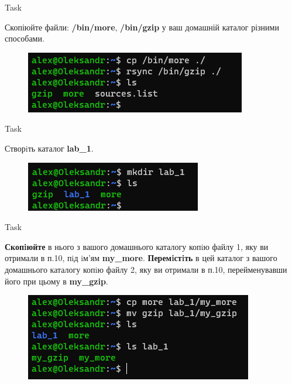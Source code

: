 \documentclass[a4paper,12pt]{article}
\newcommand{\RomanNumeralCaps}[1]{\MakeUppercase{\romannumeral #1}}
\begin{document}
    \begin{center}
        \Large{Task \RomanNumeralCaps{10}}
    \end{center}
    Скопіюйте файли: \textbf{/bin/more}, \textbf{/bin/gzip} у ваш домашній каталог різними способами.
    \begin{figure}[h!]
        \begin{minipage}[h]{1\linewidth}
            \centering
            \includegraphics[width=0.6\linewidth]{Prt sc/Figure_10.png}  
        \end{minipage}
    \end{figure}

\newpage
    \begin{center}
        \Large{Task \RomanNumeralCaps{11}}
    \end{center}
    Створiть каталог \textbf{lab\_1}.
    \begin{figure}[h!]
        \begin{minipage}[h]{1\linewidth}
            \centering
            \includegraphics[width=0.6\linewidth]{Prt sc/Figure_11.png}  
        \end{minipage}
    \end{figure}

    \begin{center}
        \Large{Task \RomanNumeralCaps{12}}
    \end{center}
    \textbf{Скопiюйте} в нього з вашого домашнього каталогу копiю файлу 1, яку ви отримали в
    п.10, пiд iм’ям \textbf{my\_more}. \textbf{Перемiстiть} в цей каталог з вашого домашнього каталогу
    копiю файлу 2, яку ви отримали в п.10, перейменувавши його при цьому в \textbf{my\_gzip}.
    \begin{figure}[h!]
        \begin{minipage}[h]{1\linewidth}
            \centering
            \includegraphics[width=0.6\linewidth]{Prt sc/Figure_12.png}  
        \end{minipage}
    \end{figure}
\end{document}
